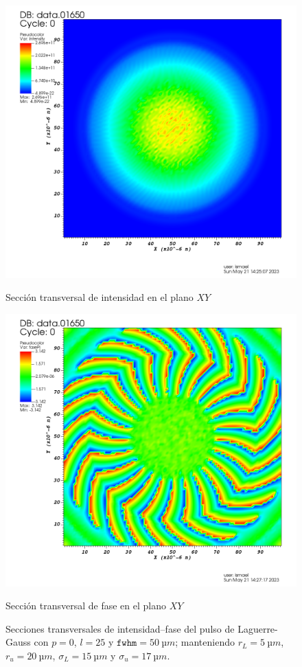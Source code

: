 \begin{figure}[htbp]
  \centering
  \begin{subcaptionblock}{.4\textwidth}
    \centering
    \includegraphics[width=\textwidth]{Figuras/ch4_oam9.png}
    \caption{Sección transversal de intensidad en el plano $XY$}\label{fig:ch4_oam9}
  \end{subcaptionblock}
  \begin{subcaptionblock}{.4\textwidth}
    \centering
    \includegraphics[width=\textwidth]{Figuras/ch4_oam10.png}
    \caption{Sección transversal de fase en el plano $XY$}\label{fig:ch4_oam10}
  \end{subcaptionblock}
   \caption{Secciones transversales de intensidad--fase del pulso de Laguerre-Gauss con $p=0$, $l=25$ y $\texttt{fwhm}=\qty{50}{µm}$; manteniendo $r_{L}=\qty{5}{µm}$, $r_{u}=\qty{20}{µm}$, $\sigma_{L}=\qty{15}{µm}$ y $\sigma_{u}=\qty{17}{µm}$.}
   \label{fig:4.38}
\end{figure}

